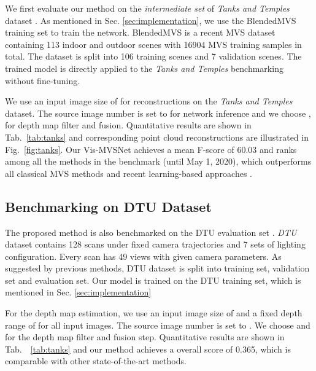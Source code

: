 \documentclass{bmvc2k}
\begin{document}
We first evaluate our method on the \textit{intermediate set} of \textit{Tanks and Temples} dataset \cite{knapitsch2017tanks}. As mentioned in Sec. \ref{sec:implementation}, we use the BlendedMVS training set \cite{yao2020blendedmvs} to train the network. BlendedMVS is a recent MVS dataset containing 113 indoor and outdoor scenes with 16904 MVS training samples in total. The dataset is split into 106 training scenes and 7 validation scenes. The trained model is directly applied to the \textit{Tanks and Temples} benchmarking without fine-tuning. 


We use an input image size of  for reconstructions on the \textit{Tanks and Temples} dataset. The source image number is set to  for network inference and we choose ,  for depth map filter and fusion. Quantitative results are shown in Tab.\ \ref{tab:tanks} and corresponding point cloud reconstructions are illustrated in Fig.\ \ref{fig:tanks}. Our Vis-MVSNet achieves a mean F-score of 60.03 and ranks  among all the methods in the benchmark (until May 1, 2020), which outperforms all classical MVS methods \cite{schonberger2016pixelwise,xu2019multi} and recent learning-based approaches \cite{yao2018mvsnet,chen2019point,yang2020cost,cheng2020deep,gu2020cascade}. 


\subsection{Benchmarking on DTU Dataset}\label{sec:dtu}

The proposed method is also benchmarked on the DTU evaluation set \cite{jensen2014large}. \textit{DTU} dataset contains 128 scans under fixed camera trajectories and 7 sets of lighting configuration. Every scan has 49 views with given camera parameters. As suggested by previous methods\cite{ji2017surfacenet,yao2018mvsnet}, DTU dataset is split into training set, validation set and evaluation set. Our model is trained on the DTU training set, which is mentioned in Sec. \ref{sec:implementation}

For the depth map estimation, we use an input image size of  and a fixed depth range of  for all input images. The source image number is set to . We choose  and  for the depth map filter and fusion step. Quantitative results are shown in Tab.\ \ \ref{tab:tanks} and our method achieves a overall score of 0.365, which is comparable with other state-of-the-art methods. 
\end{document}
